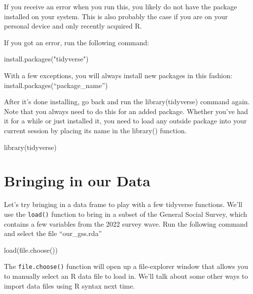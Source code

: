 \documentclass[
  letterpaper,
  DIV=11,
  numbers=noendperiod]{scrreprt}
\newenvironment{Shaded}{\begin{snugshade}}{\end{snugshade}}
\newcommand{\FunctionTok}[1]{\textcolor[rgb]{0.28,0.35,0.67}{#1}}
\newcommand{\NormalTok}[1]{\textcolor[rgb]{0.00,0.23,0.31}{#1}}
\newcommand{\StringTok}[1]{\textcolor[rgb]{0.13,0.47,0.30}{#1}}
\begin{document}
If you receive an error when you run this, you likely do not have the
package installed on your system. This is also probably the case if you
are on your personal device and only recently acquired R.

If you got an error, run the following command:

\begin{Shaded}
\begin{Highlighting}[]
\FunctionTok{install.packages}\NormalTok{(}\StringTok{"tidyverse"}\NormalTok{)}
\end{Highlighting}
\end{Shaded}

With a few exceptions, you will always install new packages in this
fashion: install.packages(``package\_name'')

After it's done installing, go back and run the library(tidyverse)
command again. Note that you always need to do this for an added
package. Whether you've had it for a while or just installed it, you
need to load any outside package into your current session by placing
its name in the library() function.

\begin{Shaded}
\begin{Highlighting}[]
\FunctionTok{library}\NormalTok{(tidyverse)}
\end{Highlighting}
\end{Shaded}

\section{Bringing in our Data}\label{bringing-in-our-data}

Let's try bringing in a data frame to play with a few tidyverse
functions. We'll use the \texttt{load()} function to bring in a subset
of the General Social Survey, which contains a few variables from the
2022 survey wave. Run the following command and select the file
``our\_gss.rda''

\begin{Shaded}
\begin{Highlighting}[]
\FunctionTok{load}\NormalTok{(}\FunctionTok{file.choose}\NormalTok{())}
\end{Highlighting}
\end{Shaded}

The \texttt{file.choose()} function will open up a file-explorer window
that allows you to manually select an R data file to load in. We'll talk
about some other ways to import data files using R syntax next time.
\end{document}
